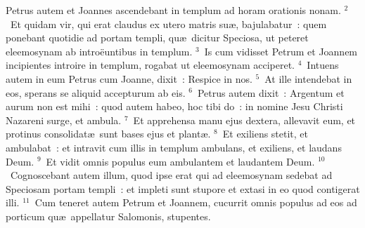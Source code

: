\lettrine[lines=3,image=true,loversize=0.05,lraise=-0.03]{P}{}etrus autem et Joannes ascendebant in templum ad horam orationis nonam.
${}^{2}$~Et quidam vir, qui erat claudus ex utero matris su\ae , bajulabatur~: quem ponebant quotidie ad portam templi, qu\ae\ dicitur Speciosa, ut peteret eleemosynam ab intro\"euntibus in templum.
${}^{3}$~Is cum vidisset Petrum et Joannem incipientes introire in templum, rogabat ut eleemosynam acciperet.
${}^{4}$~Intuens autem in eum Petrus cum Joanne, dixit~: Respice in nos.
${}^{5}$~At ille intendebat in eos, sperans se aliquid accepturum ab eis.
${}^{6}$~Petrus autem dixit~: Argentum et aurum non est mihi~: quod autem habeo, hoc tibi do~: in nomine Jesu Christi Nazareni surge, et ambula.
${}^{7}$~Et apprehensa manu ejus dextera, allevavit eum, et protinus consolidat\ae\ sunt bases ejus et plant\ae .
${}^{8}$~Et exiliens stetit, et ambulabat~: et intravit cum illis in templum ambulans, et exiliens, et laudans Deum.
${}^{9}$~Et vidit omnis populus eum ambulantem et laudantem Deum.
${}^{10}$~Cognoscebant autem illum, quod ipse erat qui ad eleemosynam sedebat ad Speciosam portam templi~: et impleti sunt stupore et extasi in eo quod contigerat illi.
${}^{11}$~Cum teneret autem Petrum et Joannem, cucurrit omnis populus ad eos ad porticum qu\ae\ appellatur Salomonis, stupentes.


